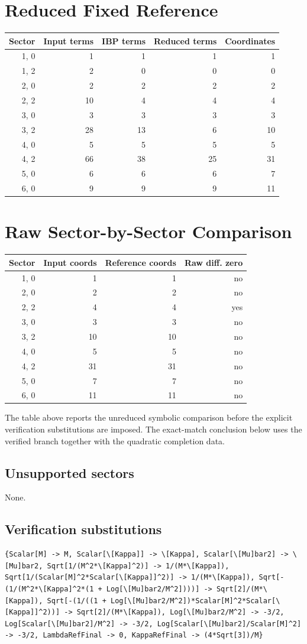 \documentclass[11pt]{article}
\begin{document}
\section{Reduced Fixed Reference}
\begin{longtable}{rrrrr}
\toprule
Sector & Input terms & IBP terms & Reduced terms & Coordinates \\
\midrule
{1, 0} & 1 & 1 & 1 & 1 \\
{1, 2} & 2 & 0 & 0 & 0 \\
{2, 0} & 2 & 2 & 2 & 2 \\
{2, 2} & 10 & 4 & 4 & 4 \\
{3, 0} & 3 & 3 & 3 & 3 \\
{3, 2} & 28 & 13 & 6 & 10 \\
{4, 0} & 5 & 5 & 5 & 5 \\
{4, 2} & 66 & 38 & 25 & 31 \\
{5, 0} & 6 & 6 & 6 & 7 \\
{6, 0} & 9 & 9 & 9 & 11 \\
\bottomrule
\end{longtable}
\section{Raw Sector-by-Sector Comparison}
\begin{longtable}{rrrr}
\toprule
Sector & Input coords & Reference coords & Raw diff. zero \\
\midrule
{1, 0} & 1 & 1 & no \\
{2, 0} & 2 & 2 & no \\
{2, 2} & 4 & 4 & yes \\
{3, 0} & 3 & 3 & no \\
{3, 2} & 10 & 10 & no \\
{4, 0} & 5 & 5 & no \\
{4, 2} & 31 & 31 & no \\
{5, 0} & 7 & 7 & no \\
{6, 0} & 11 & 11 & no \\
\bottomrule
\end{longtable}
The table above reports the unreduced symbolic comparison before the explicit verification substitutions are imposed. The exact-match conclusion below uses the verified branch together with the quadratic completion data.
\subsection{Unsupported sectors}
None.
\subsection{Verification substitutions}
\begin{verbatim}
{Scalar[M] -> M, Scalar[\[Kappa]] -> \[Kappa], Scalar[\[Mu]bar2] -> \[Mu]bar2, Sqrt[1/(M^2*\[Kappa]^2)] -> 1/(M*\[Kappa]), Sqrt[1/(Scalar[M]^2*Scalar[\[Kappa]]^2)] -> 1/(M*\[Kappa]), Sqrt[-(1/(M^2*\[Kappa]^2*(1 + Log[\[Mu]bar2/M^2])))] -> Sqrt[2]/(M*\[Kappa]), Sqrt[-(1/((1 + Log[\[Mu]bar2/M^2])*Scalar[M]^2*Scalar[\[Kappa]]^2))] -> Sqrt[2]/(M*\[Kappa]), Log[\[Mu]bar2/M^2] -> -3/2, Log[Scalar[\[Mu]bar2]/M^2] -> -3/2, Log[Scalar[\[Mu]bar2]/Scalar[M]^2] -> -3/2, LambdaRefFinal -> 0, KappaRefFinal -> (4*Sqrt[3])/M}
\end{verbatim}
\end{document}
